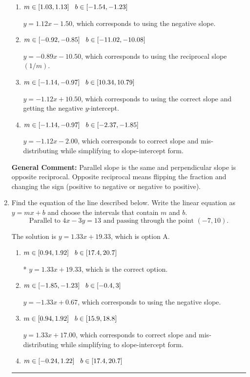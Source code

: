 \documentclass{extbook}[14pt]
\newcommand{\litem}[1]{\item #1

\rule{\textwidth}{0.4pt}}
\begin{document}
\begin{enumerate}
{\begin{enumerate}[label=\Alph*.]
* $y = -1.12x - 10.50$, which is the correct option.
\item \( m \in [1.03, 1.13] \hspace*{3mm} b \in [-1.54, -1.23] \)

 $y = 1.12x - 1.50$, which corresponds to using the negative slope.
\item \( m \in [-0.92, -0.85] \hspace*{3mm} b \in [-11.02, -10.08] \)

 $y = -0.89x - 10.50$, which corresponds to using the reciprocal slope $(1/m)$.
\item \( m \in [-1.14, -0.97] \hspace*{3mm} b \in [10.34, 10.79] \)

 $y = -1.12x + 10.50$, which corresponds to using the correct slope and getting the negative $y$-intercept.
\item \( m \in [-1.14, -0.97] \hspace*{3mm} b \in [-2.37, -1.85] \)

 $y = -1.12x - 2.00$, which corresponds to correct slope and mis-distributing while simplifying to slope-intercept form.
\end{enumerate}

\textbf{General Comment:} Parallel slope is the same and perpendicular slope is opposite reciprocal. Opposite reciprocal means flipping the fraction and changing the sign (positive to negative or negative to positive).
}
\litem{
Find the equation of the line described below. Write the linear equation as $ y=mx+b $ and choose the intervals that contain $m$ and $b$.
\[ \text{Parallel to } 4 x - 3 y = 13 \text{ and passing through the point } (-7, 10). \]

The solution is \( y = 1.33x + 19.33 \), which is option A.\begin{enumerate}[label=\Alph*.]
\item \( m \in [0.94, 1.92] \hspace*{3mm} b \in [17.4, 20.7] \)

* $y = 1.33x + 19.33$, which is the correct option.
\item \( m \in [-1.85, -1.23] \hspace*{3mm} b \in [-0.4, 3] \)

 $y = -1.33x + 0.67$, which corresponds to using the negative slope.
\item \( m \in [0.94, 1.92] \hspace*{3mm} b \in [15.9, 18.8] \)

 $y = 1.33x + 17.00$, which corresponds to correct slope and mis-distributing while simplifying to slope-intercept form.
\item \( m \in [-0.24, 1.22] \hspace*{3mm} b \in [17.4, 20.7] \)


\end{enumerate}}
\end{enumerate}
\end{document}
